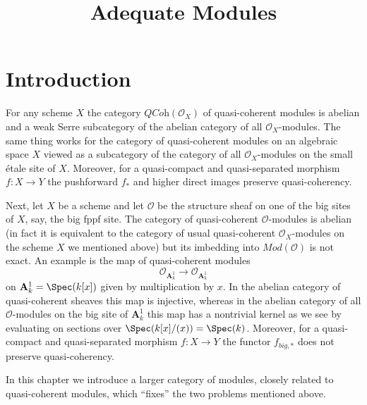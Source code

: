 

%


\title{Adequate Modules}


\maketitle

\label{section-phantom}

\tableofcontents

\section{Introduction}
\label{section-introduction}

\noindent
For any scheme $X$ the category $\textit{QCoh}(\mathcal{O}_X)$
of quasi-coherent modules is abelian and a weak Serre subcategory
of the abelian category of all $\mathcal{O}_X$-modules. The same
thing works for the category of quasi-coherent modules on
an algebraic space $X$ viewed as a subcategory of the category
of all $\mathcal{O}_X$-modules on the small \'etale site of $X$.
Moreover, for a quasi-compact and quasi-separated morphism
$f : X \to Y$ the pushforward $f_*$ and higher direct images
preserve quasi-coherency.

\medskip\noindent
Next, let $X$ be a scheme and let $\mathcal{O}$ be the structure
sheaf on one of the big sites of $X$, say, the big fppf site.
The category of quasi-coherent $\mathcal{O}$-modules is abelian
(in fact it is equivalent to the category of usual quasi-coherent
$\mathcal{O}_X$-modules on the scheme $X$ we mentioned above)
but its imbedding into $\textit{Mod}(\mathcal{O})$ is not exact.
An example is the map of quasi-coherent modules
$$
\mathcal{O}_{\mathbf{A}^1_k}
\longrightarrow
\mathcal{O}_{\mathbf{A}^1_k}
$$
on $\mathbf{A}^1_k = \Spec(k[x])$ given by multiplication by $x$.
In the abelian category of quasi-coherent sheaves this map is injective,
whereas in the abelian category of all $\mathcal{O}$-modules on the
big site of $\mathbf{A}^1_k$ this map has a nontrivial kernel as we
see by evaluating on sections over $\Spec(k[x]/(x)) = \Spec(k)$.
Moreover, for a quasi-compact and quasi-separated morphism
$f : X \to Y$ the functor $f_{big, *}$ does not preserve quasi-coherency.

\medskip\noindent
In this chapter we introduce a larger category of modules, closely related
to quasi-coherent modules, which ``fixes'' the two problems mentioned above.





